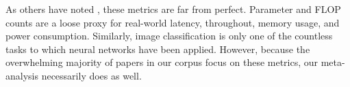 As others have noted \cite{lempitsky-cp-decomp, perforated-cnns, bayesian-compression, sze-energy-aware, learning-both, samsung-vbmf-tucker, ssl, thinet-channel-norms, amc-automl-han}, these metrics are far from perfect. Parameter and FLOP counts are a loose proxy for real-world latency, throughout, memory usage, and power consumption. %
Similarly, image classification is only one of the countless tasks to which neural networks have been applied. However, because the overwhelming majority of papers in our corpus focus on these metrics, our meta-analysis necessarily does as well.



